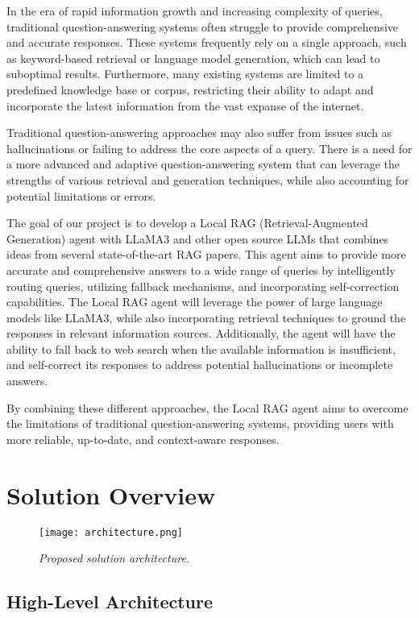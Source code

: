 In the era of rapid information growth and increasing complexity of queries, traditional question-answering systems often struggle to provide comprehensive and accurate responses. These systems frequently rely on a single approach, such as keyword-based retrieval or language model generation, which can lead to suboptimal results. Furthermore, many existing systems are limited to a predefined knowledge base or corpus, restricting their ability to adapt and incorporate the latest information from the vast expanse of the internet.

Traditional question-answering approaches may also suffer from issues such as hallucinations \cite{zhang2023sirens} or failing to address the core aspects of a query. There is a need for a more advanced and adaptive question-answering system that can leverage the strengths of various retrieval and generation techniques, while also accounting for potential limitations or errors.

The goal of our project is to develop a Local RAG (Retrieval-Augmented Generation) agent with LLaMA3 and other open source LLMs that combines ideas from several state-of-the-art RAG papers. This agent aims to provide more accurate and comprehensive answers to a wide range of queries by intelligently routing queries, utilizing fallback mechanisms, and incorporating self-correction capabilities. The Local RAG agent will leverage the power of large language models like LLaMA3, while also incorporating retrieval techniques to ground the responses in relevant information sources. Additionally, the agent will have the ability to fall back to web search when the available information is insufficient, and self-correct its responses to address potential hallucinations or incomplete answers.

By combining these different approaches, the Local RAG agent aims to overcome the limitations of traditional question-answering systems, providing users with more reliable, up-to-date, and context-aware responses.

\section{Solution Overview}

\begin{figure}[!ht]
    \centering
    \texttt{[image: architecture.png]}
    \caption{\it{Proposed solution architecture.}}
\end{figure}

\subsection{High-Level Architecture}


